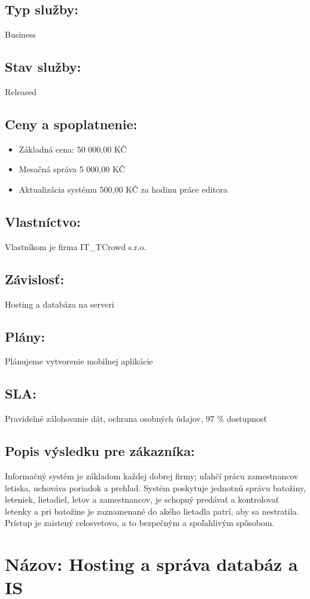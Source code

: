 \documentclass[a4paper, 11pt]{article}
\begin{document}
\subsection*{Typ služby:}
Business
\subsection*{Stav služby:}
Released
\subsection*{Ceny a spoplatnenie:}
\begin{itemize}
\item Základná cena: 50 000,00 KČ
\item Mesačná správa 5 000,00 KČ
\item Aktualizácia systému 500,00 KČ za hodinu práce editora
\end{itemize}
\subsection*{Vlastníctvo:}
Vlastníkom je firma IT\_TCrowd s.r.o.
\subsection*{Závislosť:}
Hosting a databáza na serveri
\subsection*{Plány:}
Plánujeme vytvorenie mobilnej aplikácie
\subsection*{SLA:}
Pravidelné zálohovanie dát, ochrana osobných údajov, 97 \% dostupnosť
\subsection*{Popis výsledku pre zákazníka:}
Informačný systém je základom každej dobrej firmy; uľahčí prácu zamestnancov letiska, uchováva poriadok a prehľad. Systém poskytuje jednotnú správu batožiny, leteniek, lietadiel, letov a zamestnancov, je schopný predávať a kontrolovať letenky a pri batožine je zaznamenané do akého lietadla patrí, aby sa nestratila. Prístup je zaistený celosvetovo, a to bezpečným a spoľahlivým spôsobom.

\section*{Názov: Hosting a správa databáz a IS}
\end{document}
